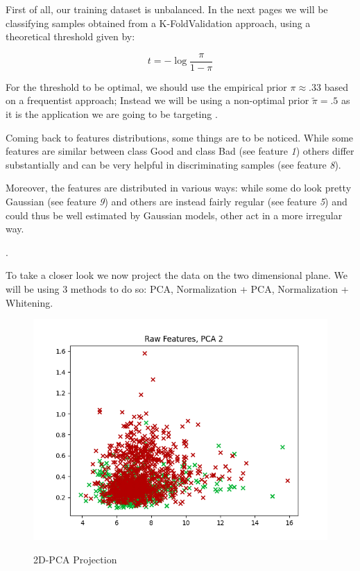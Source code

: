 \documentclass[12pt, twocolumn]{article}
\begin{document}
First of all, our training dataset is unbalanced. 
In the next pages we will be classifying samples obtained from a K-Fold\footnotemark Validation approach, using a theoretical threshold given by:

$$ t = -\log{\frac{\pi}{1-\pi}} $$

For the threshold to be optimal, we should use the empirical prior $\pi \approx .33$ based on a frequentist approach;
Instead we will be using a non-optimal prior $\tilde{\pi} = .5$ as it is the application we are going to be targeting
.

Coming back to features distributions, some things are to be noticed.
While some features are similar between class Good and class Bad (see feature {\it 1}) others differ substantially and can be very helpful in discriminating samples (see feature {\it 8}).

Moreover, the features are distributed in various ways: while some do look pretty Gaussian (see feature {\it 9}) and others are instead fairly regular (see feature {\it 5}) and could thus be well estimated by Gaussian models\footnotemark , other act in a more irregular way.

.

To take a closer look we now project the data on the two dimensional plane. 
We will be using 3 methods to do so: PCA\footnotemark , Normalization + PCA, Normalization + Whitening.


\begin{figure}[H]     
    {\includegraphics[width=\linewidth]{2DRAW.png}}
    \caption{2D-PCA Projection}
    \label{fig:2DRAW}
\end{figure}
\end{document}
